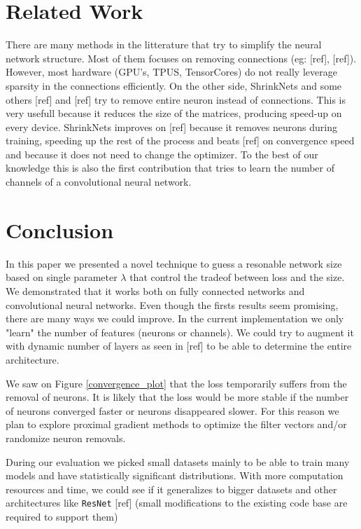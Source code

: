 \documentclass[sigconf]{acmart}
\begin{document}
\section{Related Work}

\par There are many methods in the litterature that try to simplify the neural
network structure. Most of them focuses on removing connections (eg: [ref],
[ref]).  However, most hardware (GPU's, TPUS, TensorCores) do not really
leverage sparsity in the connections efficiently. On the other side, ShrinkNets
and some others [ref] and [ref] try to remove entire neuron instead of
connections. This is very usefull because it reduces the size of the matrices,
producing speed-up on every device. ShrinkNets improves on [ref] because it
removes neurons during training, speeding up the rest of the process and beats
[ref] on convergence speed and because it does not need to change the
optimizer. To the best of our knowledge this is also the first contribution
that tries to learn the number of channels of a convolutional neural network.

\section{Conclusion}

In this paper we presented a novel technique to guess a resonable network size
based on single parameter $\lambda$ that control the tradeof between loss and
the size. We demonstrated that it works both on fully connected networks and
convolutional neural networks.  Even though the firsts results seem promising,
there are many ways we could improve. In the current
implementation we only "learn" the number of features (neurons or channels). We
could try to augment it with dynamic number of layers as seen in [ref] to be
able to determine the entire architecture. \par We saw on Figure
\ref{convergence_plot} that the loss temporarily suffers from the removal of
neurons. It is likely that the loss would be more stable if the number of
neurons converged faster or neurons disappeared slower. For this reason we plan
to explore proximal gradient methods to optimize the filter vectors and/or
randomize neuron removals. \par During our evaluation we picked small datasets
mainly to be able to train many models and have statistically significant
distributions. With more computation resources and time, we could see if it
generalizes to bigger datasets and other architectures like \texttt{ResNet}
[ref] (small modifications to the existing code base are required to support
them)



\end{document}
